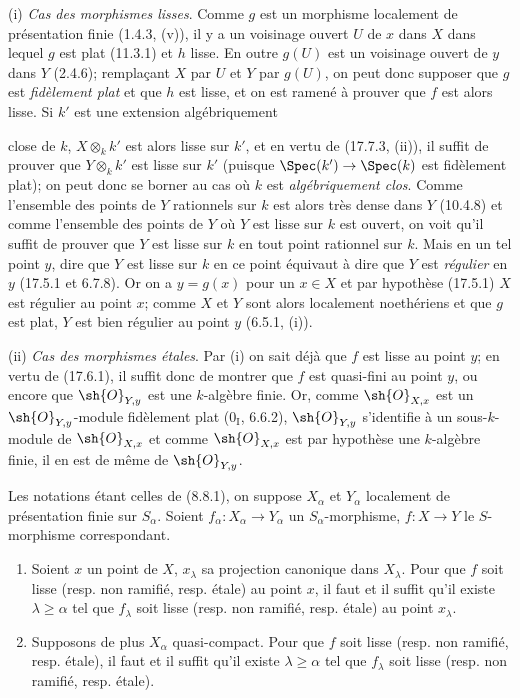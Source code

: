 (i) \emph{Cas des morphismes lisses}. Comme $g$ est un morphisme localement de présentation finie (1.4.3, (v)), il y a un voisinage ouvert $U$ de $x$ dans $X$ dans lequel $g$ est plat (11.3.1) et $h$ lisse. En outre $g(U)$ est un voisinage ouvert de $y$ dans $Y$ (2.4.6); remplaçant $X$ par $U$ et $Y$ par $g(U)$, on peut donc supposer que $g$ est \emph{fidèlement plat} et que $h$ est lisse, et on est ramené à prouver que $f$ est alors lisse. Si $k'$ est une extension algébriquement


close de $k$, $X\otimes_k k'$ est alors lisse sur $k'$, et en vertu de (17.7.3, (ii)), il suffit de prouver que $Y\otimes_k k'$ est lisse sur $k'$ (puisque $\Spec(k')\to\Spec(k)$ est fidèlement plat); on peut donc se borner au cas où $k$ est \emph{algébriquement clos}. Comme l'ensemble des points de $Y$ rationnels sur $k$ est alors très dense dans $Y$ (10.4.8) et comme l'ensemble des points de $Y$ où $Y$ est lisse sur $k$ est ouvert, on voit qu'il suffit de prouver que $Y$ est lisse sur $k$ en tout point rationnel sur $k$. Mais en un tel point $y$, dire que $Y$ est lisse sur $k$ en ce point équivaut à dire que $Y$ est \emph{régulier} en $y$ (17.5.1 et 6.7.8). Or on a $y=g(x)$ pour un $x\in X$ et par hypothèse (17.5.1) $X$ est régulier au point $x$; comme $X$ et $Y$ sont alors localement noethériens et que $g$ est plat, $Y$ est bien régulier au point $y$ (6.5.1, (i)).

(ii) \emph{Cas des morphismes étales}. Par (i) on sait déjà que $f$ est lisse au point $y$; en vertu de (17.6.1), il suffit donc de montrer que $f$ est quasi-fini au point $y$, ou encore que $\sh{O}_{Y,y}$ est une $k$-algèbre finie. Or, comme $\sh{O}_{X,x}$ est un $\sh{O}_{Y,y}$-module fidèlement plat ($0_{\mathrm I}$, 6.6.2), $\sh{O}_{Y,y}$ s'identifie à un sous-$k$-module de $\sh{O}_{X,x}$ et comme $\sh{O}_{X,x}$ est par hypothèse une $k$-algèbre finie, il en est de même de $\sh{O}_{Y,y}$.

\begin{proposition}[17.7.8]
\label{IV.17.7.8}
Les notations étant celles de (8.8.1), on suppose $X_\alpha$ et $Y_\alpha$ localement de présentation finie sur $S_\alpha$. Soient $f_\alpha:X_\alpha\to Y_\alpha$ un $S_\alpha$-morphisme, $f:X\to Y$ le $S$-morphisme correspondant.
\begin{enumerate}
  \item[(i)] Soient $x$ un point de $X$, $x_\lambda$ sa projection canonique dans $X_\lambda$. Pour que $f$ soit lisse (resp. non ramifié, resp. étale) au point $x$, il faut et il suffit qu'il existe $\lambda\geq\alpha$ tel que $f_\lambda$ soit lisse (resp. non ramifié, resp. étale) au point $x_\lambda$.
  \item[(ii)] Supposons de plus $X_\alpha$ quasi-compact. Pour que $f$ soit lisse (resp. non ramifié, resp. étale), il faut et il suffit qu'il existe $\lambda\geq\alpha$ tel que $f_\lambda$ soit lisse (resp. non ramifié, resp. étale).
\end{enumerate}
\end{proposition}

